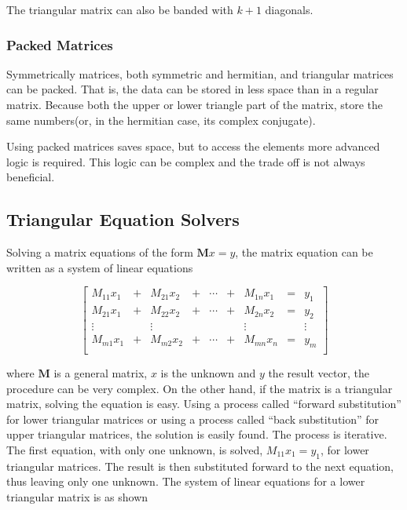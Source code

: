 The triangular matrix can also be banded with $k+1$ diagonals.

\subsubsection{Packed Matrices}

Symmetrically matrices, both symmetric and hermitian, and triangular
matrices can be packed. That is, the data can be stored in less space
than in a regular matrix. Because both the upper or lower triangle
part of the matrix, store the same numbers(or, in the hermitian case,
its complex conjugate).

Using packed matrices saves space, but to access the elements more
advanced logic is required. This logic can be complex and the trade
off is not always beneficial.

\subsection{Triangular Equation Solvers}

Solving a matrix equations of the form $\mathbf{M} x = y$, the matrix
equation can be written as a system of linear equations

\[
\left[
\begin{array}{ccccccccc}
M_{11} x_{1} & + & M_{21} x_{2}  & + & \cdots  & + & M_{1n} x_{1} & = & y_{1}\\
M_{21} x_{1} & + & M_{22} x_{2}  & + & \cdots  & + & M_{2n} x_{2} & = & y_{2}\\
\vdots      &   & \vdots       &   &         &   & \vdots      &   & \vdots\\
M_{m1} x_{1} & + & M_{m2} x_{2}  & + & \cdots  & + & M_{mn} x_{n} &  = & y_{m}\\
\end{array}
\right]
\]

where $\mathbf{M}$ is a general matrix, $x$ is the unknown and $y$ the
result vector, the procedure can be very complex. On the other hand,
if the matrix is a triangular matrix, solving the equation is
easy. Using a process called ``forward substitution'' for lower
triangular matrices or using a process called ``back substitution''
for upper triangular matrices, the solution is easily found. The
process is iterative. The first equation, with only one unknown, is
solved, $M_{11} x_1 = y_1$, for lower triangular matrices. The result
is then substituted forward to the next equation, thus leaving only
one unknown. The system of linear equations for a lower triangular
matrix is as shown

